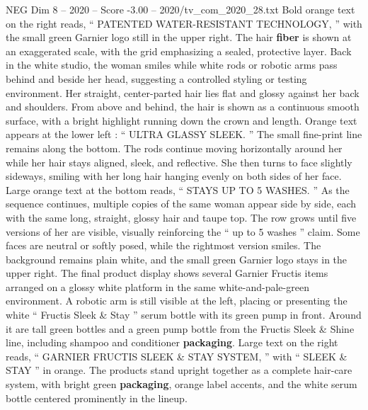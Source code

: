 \begin{textsample}{NEG Dim 8 – 2020 – Score -3.00 – 2020/tv\_com\_2020\_28.txt}
Bold orange text on the right reads, “ PATENTED WATER-RESISTANT TECHNOLOGY, ” with the small green Garnier logo still in the upper right.
The hair \textbf{fiber} is shown at an exaggerated scale, with the grid emphasizing a sealed, protective layer.
Back in the white studio, the woman smiles while white rods or robotic arms pass behind and beside her head, suggesting a controlled styling or testing environment.
Her straight, center-parted hair lies flat and glossy against her back and shoulders.
From above and behind, the hair is shown as a continuous smooth surface, with a bright highlight running down the crown and length.
Orange text appears at the lower left : “ ULTRA GLASSY SLEEK. ” The small fine-print line remains along the bottom.
The rods continue moving horizontally around her while her hair stays aligned, sleek, and reflective.
She then turns to face slightly sideways, smiling with her long hair hanging evenly on both sides of her face.
Large orange text at the bottom reads, “ STAYS UP TO 5 WASHES. ” As the sequence continues, multiple copies of the same woman appear side by side, each with the same long, straight, glossy hair and taupe top.
The row grows until five versions of her are visible, visually reinforcing the “ up to 5 washes ” claim.
Some faces are neutral or softly posed, while the rightmost version smiles.
The background remains plain white, and the small green Garnier logo stays in the upper right.
The final product display shows several Garnier Fructis items arranged on a glossy white platform in the same white-and-pale-green environment.
A robotic arm is still visible at the left, placing or presenting the white “ Fructis Sleek \& Stay ” serum bottle with its green pump in front.
Around it are tall green bottles and a green pump bottle from the Fructis Sleek \& Shine line, including shampoo and conditioner \textbf{packaging}.
Large text on the right reads, “ GARNIER FRUCTIS SLEEK \& STAY SYSTEM, ” with “ SLEEK \& STAY ” in orange.
The products stand upright together as a complete hair-care system, with bright green \textbf{packaging}, orange label accents, and the white serum bottle centered prominently in the lineup.

\end{textsample}
